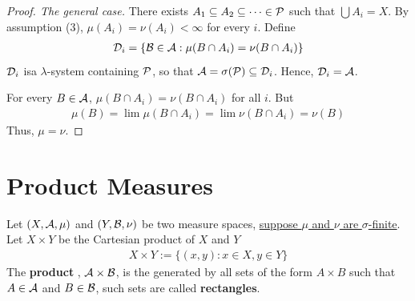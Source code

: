 \documentclass[11pt]{article}
\begin{document}
	\begin{proof}[Proof. The general case]
		There exists $A_1 \subseteq A_2 \subseteq \dots \in \mathcal{{P}}$ such that $\bigcup A_i = X$.
		By assumption (3), $\mu(A_i) = \nu(A_i) < \infty$ for every $i$.
		Define
		\begin{align}
			\mathcal{{D}}_i = \{\mathcal{{B}} \in \mathcal{{A}} : \mu(B \cap A_i) = \nu(B \cap A_i)\}
		\end{align}
		$\mathcal{{D}}_i$ isa $\lambda$-system containing $\mathcal{{P}}$, so that $\mathcal{{A}} = \sigma(\mathcal{{P}}) \subseteq \mathcal{{D}}_i$. Hence, $\mathcal{{D}}_i = \mathcal{{A}}$.
		
		For every $B \in \mathcal{{A}}$, $\mu(B \cap A_i) = \nu(B \cap A_i)$ for all $i$. But
		\begin{align}
			\mu(B) = \lim \mu(B \cap A_i) = \lim \nu(B \cap A_i) = \nu(B)
		\end{align}
		Thus, $\mu = \nu$.
	\end{proof}
	
	\section{Product Measures}
	\begin{definition}
		Let $(X, \mathcal{{A}}, \mu)$ and $(Y, \mathcal{{B}}, \nu)$ be two measure spaces, \ul{suppose $\mu$ and $\nu$ are $\sigma$-finite}.
		Let $X \times Y$ be the Cartesian product of $X$ and $Y$
		\begin{align}
			X \times Y := \{(x, y) : x \in X, y \in Y\}
		\end{align}
		The \textbf{product \salg}, $\mathcal{{A}} \times \mathcal{{B}}$, is the \salg generated by all sets of the form $A \times B$ such that $A \in \mathcal{{A}}$ and $B \in \mathcal{{B}}$, such sets are called \textbf{rectangles}.
	\end{definition}
	
\end{document}
